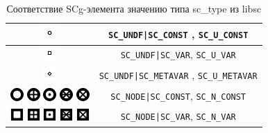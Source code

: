 \begin{table}[ht]
  \caption{Соответствие SCg-элемента значению типа sc\_type из libsc}
  \centering
  \begin{tabular}{|c|c|}
    \hline
	\includegraphics{images/4/scg2sc/undf_const} & \verb+SC_UNDF|SC_CONST+
    , \verb+SC_U_CONST+ \\
    
    \hline
    \includegraphics{images/4/scg2sc/undf_var} & \verb+SC_UNDF|SC_VAR+, \verb+SC_U_VAR+ \\
    
    \hline
    \includegraphics{images/4/scg2sc/undf_metavar} & \verb+SC_UNDF|SC_METAVAR+
    , \verb+SC_U_METAVAR+ \\
    
    \hline
    \includegraphics{images/4/scg2sc/node_general_const}
    \includegraphics{images/4/scg2sc/node_role_const}
    \includegraphics{images/4/scg2sc/node_struct_const}
    \includegraphics{images/4/scg2sc/node_concept_const}
    \includegraphics{images/4/scg2sc/node_binary_const}
    & \verb+SC_NODE|SC_CONST+, \verb+SC_N_CONST+ \\
    
    \hline
    \includegraphics{images/4/scg2sc/node_general_var}
    \includegraphics{images/4/scg2sc/node_role_var}
    \includegraphics{images/4/scg2sc/node_struct_var}
    \includegraphics{images/4/scg2sc/node_concept_var}
    \includegraphics{images/4/scg2sc/node_binary_var}
    & \verb+SC_NODE|SC_VAR+, \verb+SC_N_VAR+ \\
    

\end{tabular}
\end{table}
